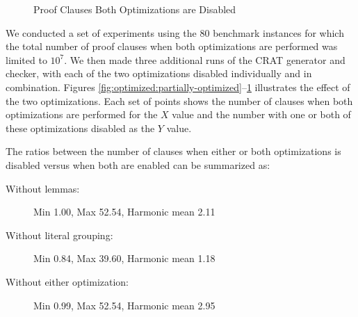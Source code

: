 \documentclass[letterpaper,USenglish,cleveref, autoref, thm-restate]{lipics-v2021}
\begin{document}
\begin{figure}
\caption{Proof Clauses Both Optimizations are Disabled}
\label{fig:optimized:unoptimized}
\end{figure}

We conducted a set of experiments using the 80 benchmark instances for
which the total number of proof clauses when both optimizations are
performed was limited to $10^7$.  We then made three additional runs
of the CRAT generator and checker, with each of the two optimizations
disabled individually and in combination.  Figures
\ref{fig:optimized:partially-optimized}--\ref{fig:optimized:unoptimized} illustrates the effect of the two
optimizations.  Each set of points shows the number of clauses when
both optimizations are performed for the $X$ value and the number with
one or both of these optimizations disabled as the $Y$ value.

The ratios between the number of clauses when either or both optimizations is disabled versus when both are enabled can be summarized as:
\begin{description}
\item[Without lemmas:] Min 1.00, Max 52.54, Harmonic mean 2.11
\item[Without literal grouping:] Min 0.84, Max 39.60, Harmonic mean 1.18
\item[Without either optimization:] Min 0.99, Max 52.54, Harmonic mean 2.95
\end{description}
\end{document}

